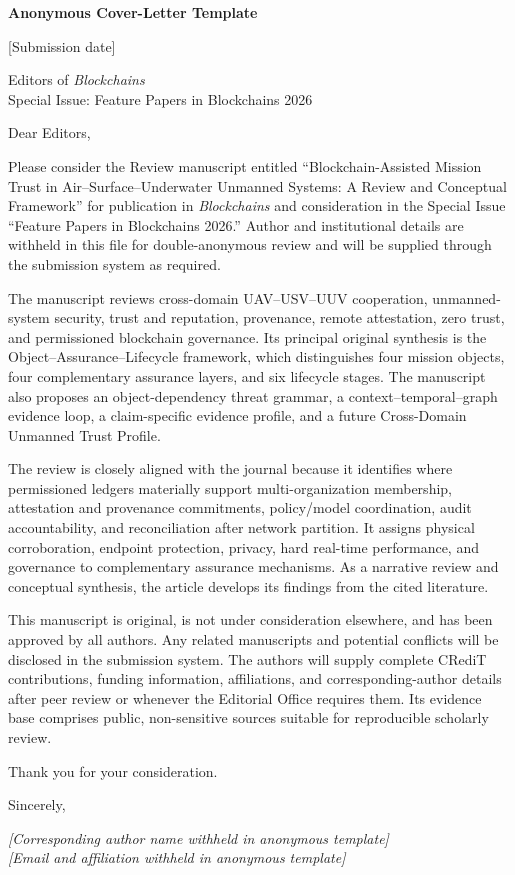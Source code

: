 \documentclass[11pt]{article}
\begin{document}
\textbf{Anonymous Cover-Letter Template}

[Submission date]

Editors of \textit{Blockchains}\\
Special Issue: Feature Papers in Blockchains 2026

Dear Editors,

Please consider the Review manuscript entitled ``Blockchain-Assisted Mission Trust in Air--Surface--Underwater Unmanned Systems: A Review and Conceptual Framework'' for publication in \textit{Blockchains} and consideration in the Special Issue ``Feature Papers in Blockchains 2026.'' Author and institutional details are withheld in this file for double-anonymous review and will be supplied through the submission system as required.

The manuscript reviews cross-domain UAV--USV--UUV cooperation, unmanned-system security, trust and reputation, provenance, remote attestation, zero trust, and permissioned blockchain governance. Its principal original synthesis is the Object--Assurance--Lifecycle framework, which distinguishes four mission objects, four complementary assurance layers, and six lifecycle stages. The manuscript also proposes an object-dependency threat grammar, a context--temporal--graph evidence loop, a claim-specific evidence profile, and a future Cross-Domain Unmanned Trust Profile.

The review is closely aligned with the journal because it identifies where permissioned ledgers materially support multi-organization membership, attestation and provenance commitments, policy/model coordination, audit accountability, and reconciliation after network partition. It assigns physical corroboration, endpoint protection, privacy, hard real-time performance, and governance to complementary assurance mechanisms. As a narrative review and conceptual synthesis, the article develops its findings from the cited literature.

This manuscript is original, is not under consideration elsewhere, and has been approved by all authors. Any related manuscripts and potential conflicts will be disclosed in the submission system. The authors will supply complete CRediT contributions, funding information, affiliations, and corresponding-author details after peer review or whenever the Editorial Office requires them. Its evidence base comprises public, non-sensitive sources suitable for reproducible scholarly review.

Thank you for your consideration.

Sincerely,

\textit{[Corresponding author name withheld in anonymous template]}\\
\textit{[Email and affiliation withheld in anonymous template]}
\end{document}
